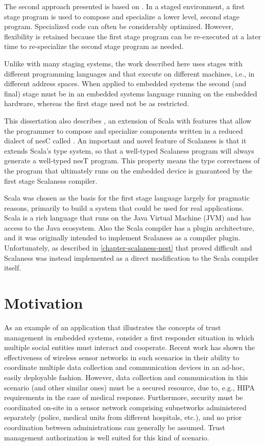 The second approach presented is based on 
\cite{Taha-MetaML,Sheard-TemplateHaskell,Mainland-Flask-2008,FramedML}. In a staged environment,
a first stage program is used to compose and specialize a lower level, second stage program.
Specialized code can often be considerably optimized. However, flexibility is retained because
the first stage program can be re-executed at a later time to re-specialize the second stage
program as needed.

Unlike with many staging systems, the work described here uses stages with different programming
languages and that execute on different machines, i.e., in different address spaces. When
applied to embedded systems the second (and final) stage must be in an embedded systems language
running on the embedded hardware, whereas the first stage need not be as restricted.

This dissertation also describes  \cite{chapin-GPCE-2013}, an extension of
Scala \cite{PiS2} with features that allow the programmer to compose and specialize components
written in a reduced dialect of nesC called . An important and novel feature of
Scalaness is that it extends Scala's type system, so that a well-typed Scalaness program will
always generate a well-typed nesT program. This  property means
the type correctness of the program that ultimately runs on the embedded device is guaranteed by
the first stage Scalaness compiler.

Scala was chosen as the basis for the first stage language largely for pragmatic reasons,
primarily to build a system that could be used for real applications. Scala is a rich language
that runs on the Java Virtual Machine (JVM) and has access to the Java ecosystem. Also the Scala
compiler has a plugin architecture, and it was originally intended to implement Scalaness as a
compiler plugin. Unfortunately, as described in \autoref{chapter-scalaness-nest} that proved
difficult and Scalaness was instead implemented as a direct modification to the Scala compiler
itself.

\section{Motivation}

As an example of an application that illustrates the concepts of trust management in embedded
systems, consider a first responder situation in which multiple social entities must interact
and cooperate. Recent work has shown the effectiveness of wireless sensor networks in such
scenarios \cite{citeulike:4460555,1038146} in their ability to coordinate multiple data
collection and communication devices in an ad-hoc, easily deployable fashion. However, data
collection and communication in this scenario (and other similar ones) must be a secured
resource, due to, e.g., HIPA requirements in the case of medical response. Furthermore, security
must be coordinated on-site in a sensor network comprising subnetworks administered separately
(police, medical units from different hospitals, etc.), and no prior coordination between
administrations can generally be assumed. Trust management authorization is well suited for this
kind of scenario.

